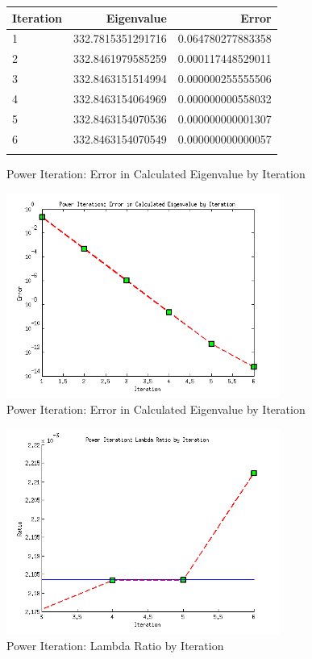 \documentclass{article}
\begin{document}
\begin{figure}
\centering
\begin{tabular}{lrr}
\toprule
Iteration & Eigenvalue & Error \\
\midrule
 1 & 332.7815351291716 & 0.064780277883358 \\
 2 & 332.8461979585259 & 0.000117448529011 \\
 3 & 332.8463151514994 & 0.000000255555506 \\
 4 & 332.8463154064969 & 0.000000000558032 \\
 5 & 332.8463154070536 & 0.000000000001307 \\
 6 & 332.8463154070549 & 0.000000000000057 \\
\bottomrule
\label{p1t1}
\end{tabular}
\caption{Power Iteration: Error in Calculated Eigenvalue by Iteration}
\end{figure}

\begin{figure}
\centering
\includegraphics[width=0.8\textwidth]{Problem1Figure1.png}
\caption{Power Iteration: Error in Calculated Eigenvalue by Iteration}
\label{p1f1}
\end{figure}

\begin{figure}
\centering
\includegraphics[width=0.8\textwidth]{Problem1Figure2.png}
\caption{Power Iteration: Lambda Ratio by Iteration}
\label{p1f2}
\end{figure}
\end{document}
